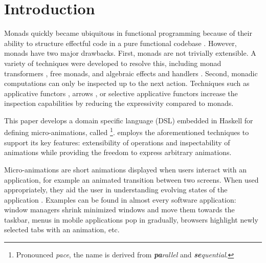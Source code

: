 \section{Introduction}
\label{sec:intro}

Monads quickly became ubiquitous in functional programming because of their ability to structure effectful code in a pure functional codebase \cite{DBLP:conf/lfp/Wadler90}. However, monads have two major drawbacks. First, monads are not trivially extensible. A variety of techniques were developed to resolve this, including monad transformers \cite{DBLP:conf/popl/LiangHJ95}, free monads, and algebraic effects and handlers \cite{DBLP:conf/esop/PlotkinP09}. Second, monadic computations can only be inspected up to the next action. Techniques such as applicative functors \cite{DBLP:journals/jfp/McbrideP08}, arrows \cite{DBLP:journals/scp/Hughes00}, or selective applicative functors \cite{Mokhov:2019:SAF:3352468.3341694} increase the inspection capabilities by reducing the expressivity compared to monads.

This paper develops a domain specific language (DSL) embedded in Haskell for defining micro-animations, called \dsl{}\footnote{Pronounced \textit{pace}, the name is derived from \textit{\textbf{pa}rallel} and \textit{\textbf{se}quential}.}. \dsl{} employs the aforementioned techniques to support its key features: extensibility of operations and inspectability of animations while providing the freedom to express arbitrary animations.

Micro-animations are short animations displayed when users interact with an application, for example an animated transition between two screens. When used appropriately, they aid the user in understanding evolving states of the application \cite{DBLP:conf/infovis/BedersonB99,DBLP:conf/chi/Gonzalez96,DBLP:journals/tvcg/HeerR07}. Examples can be found in almost every software application: window managers shrink minimized windows and move them towards the taskbar, menus in mobile applications pop in gradually, browsers highlight newly selected tabs with an animation, etc.

